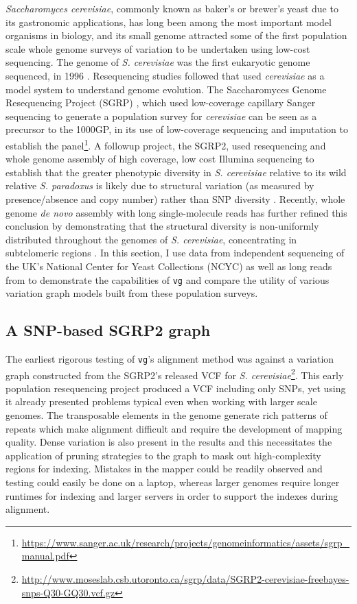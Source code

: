 \documentclass[a4paper,12pt,numbered,oneside]{Classes/PhDThesisPSnPDF}
\begin{document}
\emph{Saccharomyces cerevisiae}, commonly known as baker's or brewer's yeast due to its gastronomic applications, has long been among the most important model organisms in biology, and its small genome attracted some of the first population scale whole genome surveys of variation to be undertaken using low-cost sequencing.
The genome of \emph{S. cerevisiae} was the first eukaryotic genome sequenced, in 1996 \cite{goffeau1996life}.
Resequencing studies followed that used \emph{cerevisiae} as a model system to understand genome evolution.
The Saccharomyces Genome Resequencing Project (SGRP) \cite{liti2009population}, which used low-coverage capillary Sanger sequencing to generate a population survey for \emph{cerevisiae} can be seen as a precursor to the 1000GP, in its use of low-coverage sequencing and imputation to establish the panel\footnote{\url{https://www.sanger.ac.uk/research/projects/genomeinformatics/assets/sgrp_manual.pdf}}.
A followup project, the SGRP2, used resequencing and whole genome assembly of high coverage, low cost Illumina sequencing to establish that the greater phenotypic diversity in \emph{S. cerevisiae} relative to its wild relative \emph{S. paradoxus} is likely due to structural variation (as measured by presence/absence and copy number) rather than SNP diversity \cite{bergstrom2014high}.
Recently, whole genome \emph{de novo} assembly with long single-molecule reads has further refined this conclusion by demonstrating that the structural diversity is non-uniformly distributed throughout the genomes of \emph{S. cerevisiae}, concentrating in subtelomeric regions \cite{yue2017contrasting}.
In this section, I use data from independent sequencing of the UK's National Center for Yeast Collections (NCYC) as well as long reads from \cite{yue2017contrasting} to demonstrate the capabilities of {\tt vg} and compare the utility of various variation graph models built from these population surveys.

\subsection{A SNP-based SGRP2 graph}
\label{sec:SGRP2_graph}
The earliest rigorous testing of {\tt vg}'s alignment method was against a variation graph constructed from the SGRP2's released VCF for \emph{S. cerevisiae}\footnote{\scriptsize{\url{http://www.moseslab.csb.utoronto.ca/sgrp/data/SGRP2-cerevisiae-freebayes-snps-Q30-GQ30.vcf.gz}}}.
This early population resequencing project produced a VCF including only SNPs, yet using it already presented problems typical even when working with larger scale genomes.
The transposable elements in the genome generate rich patterns of repeats which make alignment difficult and require the development of mapping quality.
Dense variation is also present in the results and this necessitates the application of pruning strategies to the graph to mask out high-complexity regions for indexing.
Mistakes in the mapper could be readily observed and testing could easily be done on a laptop, whereas larger genomes require longer runtimes for indexing and larger servers in order to support the indexes during alignment.
\end{document}
